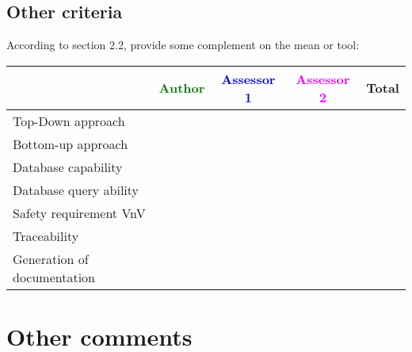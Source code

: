 \subsection{Other criteria}
According to \citep{D4.2.a} section 2.2, provide some complement on the mean or tool:


\begin{tabular}{|l | c | c | c | c|}
\hline
& \textcolor{green}{Author} & \textcolor{blue}{Assessor 1} & \textcolor{magenta}{Assessor 2} & Total \\
\hline 
Top-Down approach  & & & &  \\
\hline
Bottom-up approach & & & & \\
\hline
Database capability & & & & \\
\hline
Database query ability & & & & \\
\hline
Safety requirement VnV & & & & \\
\hline
Traceability & & & & \\
\hline
Generation of documentation & & & & \\
\hline
\end{tabular}


\section{Other comments}



\begin{comment}
This section is available for the author or the assessors to  complete the description and criteria.
\end{comment}



